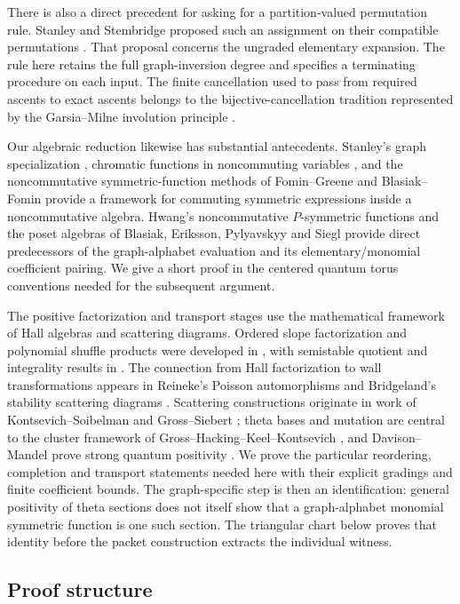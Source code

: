 There is also a direct precedent for asking for a partition-valued
permutation rule.  Stanley and Stembridge proposed such an assignment
on their compatible permutations \cite[Remark~5.6]{SS93}.  That proposal
concerns the ungraded elementary expansion.  The rule here retains the
full graph-inversion degree and specifies a terminating procedure on
each input.  The finite cancellation used to pass from required
ascents to exact ascents belongs to the bijective-cancellation
tradition represented by the Garsia--Milne involution principle
\cite{GM81}.

Our algebraic reduction likewise has substantial antecedents.
Stanley's graph specialization \cite[Section~2]{Sta98}, chromatic functions in
noncommuting variables \cite{GS01}, and the noncommutative
symmetric-function methods of Fomin--Greene and Blasiak--Fomin
\cite{FG98,BF17} provide a framework for commuting symmetric expressions
inside a noncommutative algebra.  Hwang's noncommutative
$P$-symmetric functions \cite{Hwa24} and the poset algebras of Blasiak,
Eriksson, Pylyavskyy and Siegl \cite{BEPS25} provide direct predecessors
of the graph-alphabet evaluation and its elementary/monomial
coefficient pairing.  We give a short proof in the centered quantum
torus conventions needed for the subsequent argument.

The positive factorization and transport stages use the mathematical
framework of Hall algebras and scattering diagrams.  Ordered slope
factorization and polynomial shuffle products were developed in
\cite{Rei03,KS11}, with semistable quotient and integrality results in
\cite{Ef12,FR18,DMe20}.  The connection from Hall factorization to
wall transformations appears in Reineke's Poisson automorphisms and
Bridgeland's stability scattering diagrams \cite{Rei10,Bri17}.
Scattering constructions originate in work of Kontsevich--Soibelman
and Gross--Siebert \cite{KS06,GS11,KS14}; theta bases and mutation are
central to the cluster framework of Gross--Hacking--Keel--Kontsevich
\cite{GHKK18}, and Davison--Mandel prove strong quantum positivity
\cite{DM21}.  We prove the particular reordering, completion and
transport statements needed here with their explicit gradings and
finite coefficient bounds.  The graph-specific step is then an
identification: general positivity of theta sections does not itself
show that a graph-alphabet monomial symmetric function is one such
section.  The triangular chart below proves that identity before the
packet construction extracts the individual witness.

\subsection{Proof structure}

